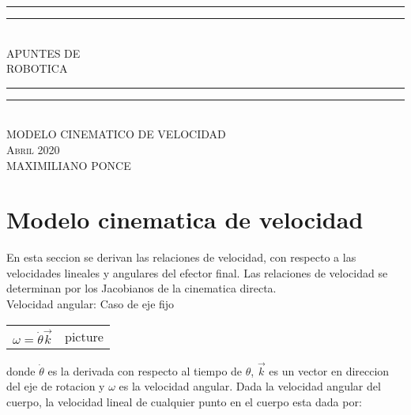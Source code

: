 \documentclass[10pt,a4paper]{article}
\newlength{\drop}
\begin{document}
\begin{titlepage}

\textheight
    \centering
    \vspace*{\baselineskip}
    \rule{\textwidth}{1.6pt}\vspace*{-\baselineskip}\vspace*{2pt}
    \rule{\textwidth}{0.6pt}\\[\baselineskip]
    {\LARGE APUNTES DE\\[0.2\baselineskip] ROBOTICA}\\[0.2\baselineskip]
    \rule{\textwidth}{0.4pt}\vspace*{-\baselineskip}\vspace{3.2pt}
    \rule{\textwidth}{1.6pt}\\[\baselineskip]
    \scshape
    MODELO CINEMATICO DE VELOCIDAD \\
    \vspace*{2\baselineskip}
    \vfill
    {\scshape Abril 2020} \\
    {\large MAXIMILIANO PONCE}\par

\end{titlepage}

\tableofcontents
\newpage

\section{Modelo cinematica de velocidad}
En esta seccion se derivan las relaciones de velocidad, con respecto a las velocidades lineales y angulares del efector final. Las relaciones de velocidad se determinan por los Jacobianos de la cinematica directa.\\

Velocidad angular: Caso de eje fijo\\
\begin{center}
	\begin{tabular}{c c}
		$\omega = \dot{\theta} \vec{k} $ & picture
	\end{tabular}
\end{center}

donde $\dot{\theta}$ es la derivada con respecto al tiempo de $\theta$, $\vec{k}$ es un vector en direccion del eje de rotacion y $\omega$ es la velocidad angular. Dada la velocidad angular del cuerpo, la velocidad lineal de cualquier punto en el cuerpo esta dada por:
\end{document}
